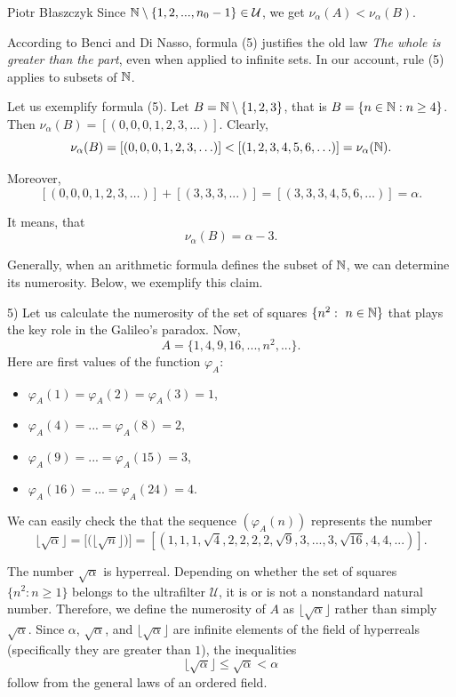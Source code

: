 \begin{artengenv}{Piotr Błaszczyk}
Since ${\mathbb{N}}\setminus\{ 1, 2, ... ,n_0-1\}\in\mathcal U$, we get $\nu_{\alpha}(A)<\nu_{\alpha}(B)$. 

According to Benci and Di Nasso, formula (5) justifies the old law \textit{The whole is greater than the part}, even when applied to infinite sets. In our account, rule (5) applies to subsets of ${\mathbb{N}}$. 



Let us  exemplify formula (5). Let $B={\mathbb{N}}\setminus\{1,2,3\}$, that is $B=\{n\in{\mathbb{N}}: n\geq 4\}$. Then   $\nu_{\alpha}(B)=[(0,0,0,1,2,3,\ldots)]$. Clearly, 
$$\nu_{\alpha}(B)=[(0,0,0,1,2,3,\ldots)]<[(1,2,3,4,5,6,\ldots)]=\nu_{\alpha}({\mathbb{N}}).$$ 

Moreover, 
\[[(0,0,0,1,2,3,\ldots)]+[(3,3,3,...)]=[(3,3,3,4,5,6,\ldots)]=\alpha.\]

It means, that
\[\nu_{\alpha}(B)=\alpha-3.\]

Generally, when an arithmetic formula defines the subset of ${\mathbb{N}}$,  we can determine its numerosity. 
Below, we exemplify this claim.


5) Let us calculate the numerosity of the set of squares \mbox{$\{n^2:\ n\in{\mathbb{N}}\}$} that plays the key role in the Galileo's paradox. Now,
\[A=\{1,4,9, 16,..., n^2,...\}.\]
Here are first values of the function $\varphi_A$:
\begin{itemize}
\item []$\varphi_{A}(1)=\varphi_{A}(2)=\varphi_{A}(3)=1$,
\item []$\varphi_{A}(4)=...=\varphi_{A}(8)=2$,
\item []$\varphi_{A}(9)=...=\varphi_{A}(15)=3$,
\item []$\varphi_{A}(16)=...=\varphi_{A}(24)=4.$
\end{itemize}

We can easily check the that the sequence $(\varphi_{A}(n))$ represents the number 
\[  \big\lfloor \sqrt\alpha\big\rfloor=  \big[\big(\big\lfloor\sqrt n\big\rfloor\big)\big]=
[(1,1,1,\sqrt 4,2,2,2,2,\sqrt 9,3,...,3,\sqrt{16},4,4,...)].   \]

The number $\sqrt \alpha$ is hyperreal. Depending on whether the set of squares $\{n^2:n \geq 1\}$  belongs to the ultrafilter  $\mathcal U$,  it  is or is not a nonstandard natural number. Therefore, we define  the numerosity of $A$ as 
$\big\lfloor \sqrt\alpha\big\rfloor$ rather than simply $\sqrt \alpha$. Since $\alpha$, $\sqrt \alpha$, and $\big\lfloor \sqrt\alpha\big\rfloor$ are infinite elements of the field of hyperreals (specifically they are greater than $1$), the inequalities 
\[\big\lfloor \sqrt\alpha\big\rfloor \leq \sqrt \alpha<\alpha\]
 follow from the general laws of an ordered field. 
 

\end{artengenv}

